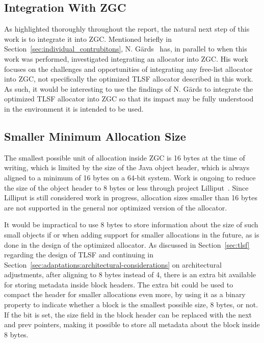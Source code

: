 
\subsection{Integration With ZGC}
\label{sec:future-work:integration}

As highlighted thoroughly throughout the report, the natural next step of this work is to integrate it into ZGC. Mentioned briefly in Section~\ref{sec:individual_contrubitons}, N. Gärds~\cite{niclas_report} has, in parallel to when this work was performed, investigated integrating an allocator into ZGC. His work focuses on the challenges and opportunities of integrating any free-list allocator into ZGC, not specifically the optimized TLSF allocator described in this work. As such, it would be interesting to use the findings of N. Gärds to integrate the optimized TLSF allocator into ZGC so that its impact may be fully understood in the environment it is intended to be used.

\newpage

\subsection{Smaller Minimum Allocation Size}
\label{sec:future-work:lilliput}

The smallest possible unit of allocation inside ZGC is 16 bytes at the time of writing, which is limited by the size of the Java object header, which is always aligned to a minimum of 16 bytes on a 64-bit system. Work is ongoing to reduce the size of the object header to 8 bytes or less through project Lilliput~\cite{lilliput}. Since Lilliput is still considered work in progress, allocation sizes smaller than 16 bytes are not supported in the general nor optimized version of the allocator.

It would be impractical to use 8 bytes to store information about the size of such small objects if or when adding support for smaller allocations in the future, as is done in the design of the optimized allocator. As discussed in Section~\ref{sec:tlsf} regarding the design of TLSF and continuing in Section~\ref{sec:adaptations:architectural-considerations} on architectural adjustments, after aligning to 8 bytes instead of 4, there is an extra bit available for storing metadata inside block headers. The extra bit could be used to compact the header for smaller allocations even more, by using it as a binary property to indicate whether a block is the smallest possible size, 8 bytes, or not. If the bit is set, the size field in the block header can be replaced with the next and prev pointers, making it possible to store all metadata about the block inside 8 bytes.

